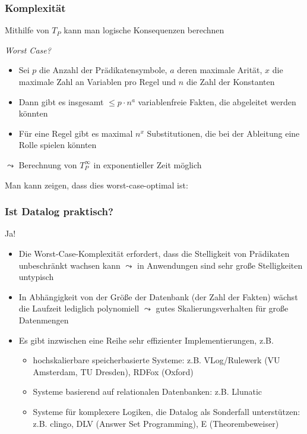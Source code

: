 \documentclass[aspectratio=1610,onlymath]{beamer}
\begin{document}
\begin{frame}\frametitle{Komplexität}

Mithilfe von $T_P$ kann man logische Konsequenzen berechnen\\
\bigskip\pause

\emph{Worst Case?}
\begin{itemize}
\item Sei $p$ die Anzahl der Prädikatensymbole, $a$ deren maximale Arität, $x$ die maximale Zahl an Variablen pro Regel und $n$ die Zahl der Konstanten
\item Dann gibt es insgesamt $\leq p\cdot n^a$ variablenfreie Fakten, die abgeleitet werden könnten
\item Für eine Regel gibt es maximal $n^x$ Substitutionen, die bei der Ableitung eine Rolle spielen könnten
\end{itemize}\pause
$\leadsto$ Berechnung von $T_P^\infty$ in exponentieller Zeit möglich
\bigskip\pause

Man kann zeigen, dass dies worst-case-optimal ist:\medskip


\end{frame}

\begin{frame}\frametitle{Ist Datalog praktisch?}

\pause\bigskip

\alert{Ja!}
\begin{itemize}
\item Die Worst-Case-Komplexität erfordert, dass die Stelligkeit von Prädikaten unbeschränkt wachsen kann $\leadsto$ in Anwendungen sind sehr große Stelligkeiten untypisch
\item In Abhängigkeit von der Größe der Datenbank (der Zahl der Fakten) wächst die Laufzeit lediglich polynomiell $\leadsto$ gutes Skalierungsverhalten für große Datenmengen
\item Es gibt inzwischen eine Reihe sehr effizienter Implementierungen, z.B.
\begin{itemize}
\item hochskalierbare speicherbasierte Systeme: z.B. VLog/Rulewerk (VU Amsterdam, TU Dresden), RDFox (Oxford)
\item Systeme basierend auf relationalen Datenbanken: z.B. Llunatic
\item Systeme für komplexere Logiken, die Datalog als Sonderfall unterstützen: z.B. clingo, DLV (Answer Set Programming), E (Theorembeweiser)
\end{itemize}
\end{itemize}

\end{frame}
\end{document}
